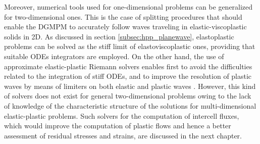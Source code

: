 Moreover, numerical tools used for one-dimensional problems can be generalized for two-dimensional ones. 
This is the case of splitting procedures that should enable the DGMPM to accurately follow waves traveling in elastic-viscoplastic solids in 2D. 
As discussed in section \ref{subsec:hpp_planewave}, elastoplastic problems can be solved as the stiff limit of elastoviscoplastic ones, providing that suitable ODEs integrators are employed. %
On the other hand, the use of approximate elastic-plastic Riemann solvers enables first to avoid the difficulties related to the integration of stiff ODEs, and to improve the resolution of plastic waves by means of limiters on both elastic and plastic waves \cite{Thomas_EP}.
However, this kind of solvers does not exist for general two-dimensional problems owing to the lack of knowledge of the characteristic structure of the solutions for multi-dimensional elastic-plastic problems. 
Such solvers for the computation of intercell fluxes, which would improve the computation of plastic flows and hence a better assessment of residual stresses and strains, are discussed in the next chapter. 

